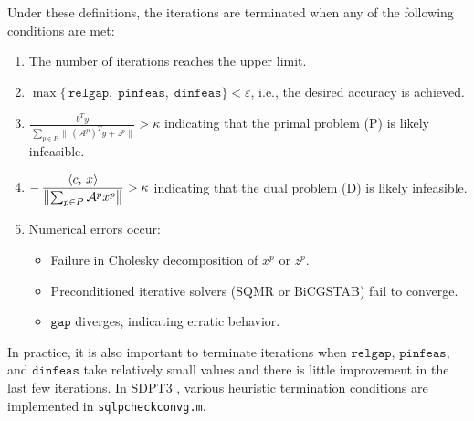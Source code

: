 Under these definitions, the iterations are terminated when any of the following conditions are met:
\begin{enumerate}
    \item The number of iterations reaches the upper limit.
    \item 
      $\displaystyle
      \max\{\,\mathtt{relgap},\;\mathtt{pinfeas},\;\mathtt{dinfeas}\}
      < \varepsilon
      $, i.e., the desired accuracy is achieved.
    \item 
      $\displaystyle
        \frac{\,b^T y\,}
              {\,\sum_{p\in P}\|\,(\mathcal{A}^p)^T y + z^p\|\!}
      > \kappa
      $
      indicating that the primal problem (P) is likely infeasible.
    \item 
      $\displaystyle
      -\,\frac{\left\langle c, \, x \right\rangle}
              {\bigl\|\sum_{p\in P}\mathcal{A}^p x^p\bigr\|}
      > \kappa
      $
      indicating that the dual problem (D) is likely infeasible.
    \item Numerical errors occur:
      \begin{itemize}
          \item Failure in Cholesky decomposition of $x^p$ or $z^p$.
          \item Preconditioned iterative solvers (SQMR or BiCGSTAB) fail to converge.
          \item $\mathtt{gap}$ diverges, indicating erratic behavior.
      \end{itemize}
\end{enumerate}
In practice, it is also important to terminate iterations when $\mathtt{relgap}$, $\mathtt{pinfeas}$, and $\mathtt{dinfeas}$ take relatively small values and there is little improvement in the last few iterations.
In SDPT3 \cite{toh1999}, various heuristic termination conditions are implemented in \texttt{sqlpcheckconvg.m}.

